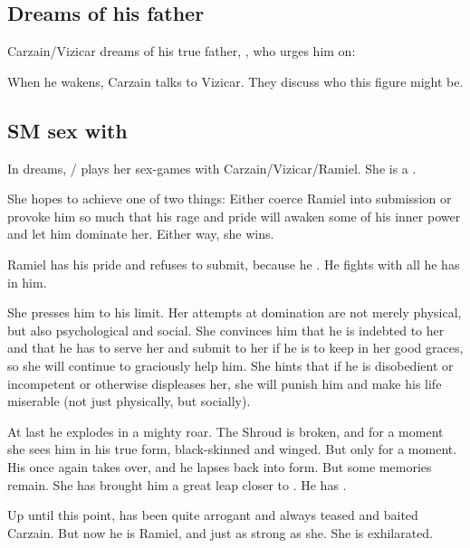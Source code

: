 \subsection{Dreams of his father}
Carzain/Vizicar dreams of his true father, , who urges him on: 

When he wakens, Carzain talks to Vizicar. 
They discuss who this  figure might be.  









\subsection{SM sex with \Belzir}
In dreams, \Belzir/\Shiaraid{} plays her sex-games with Carzain/Vizicar/Ramiel. 
She is a . 

She hopes to achieve one of two things: 
Either coerce Ramiel into submission or provoke him so much that his rage and pride will awaken some of his inner power and let him dominate her. 
Either way, she wins. 

Ramiel has his pride and refuses to submit, because he . 
He fights with all he has in him. 

She presses him to his limit. 
Her attempts at domination are not merely physical, but also psychological and social. 
She convinces him that he is indebted to her and that he has to serve her and submit to her if he is to keep in her good graces, so she will continue to graciously help him. 
She hints that if he is disobedient or incompetent or otherwise displeases her, she will punish him and make his life miserable (not just physically, but socially). 

At last he explodes in a mighty roar. 
The Shroud is broken, and for a moment she sees him in his true \resphan{} form, black-skinned and winged. 
But only for a moment. 
His  once again takes over, and he lapses back into \human{} form. 
But some memories remain. 
She has brought him a great leap closer to . 
He has . 

Up until this point, \Belzir{} has been quite arrogant and always teased and baited Carzain. 
But now he is Ramiel, and just as strong as she. 
She is exhilarated. 

